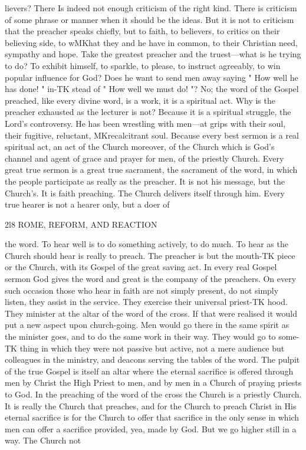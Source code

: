 \documentclass[12pt,a5paper,twoside]{book}
\begin{document}
{{lievers? There Is indeed not enough criticism of the 
right kind. There is criticism of some phrase or 
manner when it should be the ideas. But it is not 
to criticism that the preacher speaks chiefly, but to 
faith, to believers, to critics on their believing side, to 
wMKhat they and he have in common, to their Christian 
need, sympathy and hope. Take the greatest preacher 
and the truest---what is he trying to do? To exhibit 
himself, to sparkle, to please, to instruct agreeably, to 
win popular influence for God? Does he want to 
send men away saying " How well he has done! " in-TK
stead of " How well we must do! "? No; the word 
of the Gospel preached, like every divine word, is a 
work, it is a spiritual act. Why is the preacher 
exhausted as the lecturer is not? Because it is a 
spiritual struggle, the Lord's controversy. He has 
been wrestling with men---at grips with their soul, 
their fugitive, reluctant, MKrecalcitrant soul. Because 
every best sermon is a real spiritual act, an act of the 
Church moreover, of the Church which is God's 
channel and agent of grace and prayer for men, of the 
priestly Church. Every great true sermon is a great 
true sacrament, the sacrament of the word, in which 
the people participate as really as the preacher. It 
is not his message, but the Church's. It is faith 
preaching. The Church delivers itself through him. 
Every true hearer is not a hearer only, but a doer of 



2l8 ROME, REFORM, AND REACTION 

the word. To hear well is to do something actively, 
to do much. To hear as the Church should hear is 
really to preach. The preacher is but the mouth-TK
piece or the Church, with its Gospel of the great 
saving act. In every real Gospel sermon God gives 
the word and great is the company of the preachers. 
On every such occasion those who hear in faith are 
not simply present, do not simply listen, they assist 
in the service. They exercise their universal priest-TK
hood. They minister at the altar of the word of the 
cross. If that were realised it would put a new 
aspect upon church-going. Men would go there in 
the same spirit as the minister goes, and to do the 
same work in their way. They would go to some-TK
thing in which they were not passive but active, not 
a mere audience but colleagues in the ministry, and 
deacons serving the tables of the word. The pulpit 
of the true Gospel is itself an altar where the eternal 
sacrifice is offered through men by Christ the High 
Priest to men, and by men in a Church of praying 
priests to God. In the preaching of the word of the 
cross the Church is a priestly Church. It is really the 
Church that preaches, and for the Church to preach 
Christ in His eternal sacrifice is for the Church to 
offer that sacrifice in the only sense in which men 
can offer a sacrifice provided, yea, made by God. 
But we go higher still in a way. The Church not 



}}
\end{document}
